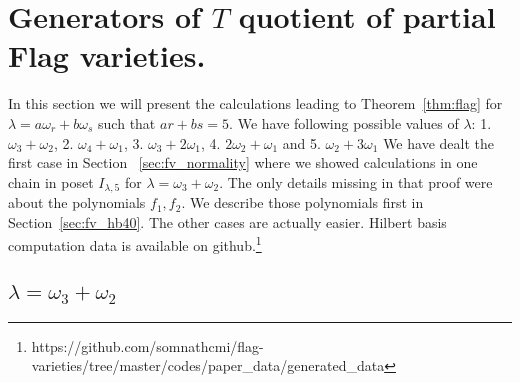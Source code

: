 \section{Generators of \(T\) quotient of partial Flag varieties.}
\label{sec:fv_hb}

In this section we will present the calculations leading to Theorem~\ref{thm:flag} for \(\lambda=a\omega_r+b\omega_s\) such that \(ar+bs = 5\). We have following possible values of \(\lambda\): 1. \(\omega_3+\omega_2\), 2. \(\omega_4+\omega_1\), 3. \(\omega_3+2\omega_1\), 4. \(2\omega_2+\omega_1\) and 5. \(\omega_2+3\omega_1\) We have dealt the first case in Section ~\ref{sec:fv_normality} where we showed calculations in one chain in poset \(I_{\lambda,5}\) for \(\lambda = \omega_3+\omega_2\).
The only details missing in that proof were about the polynomials $f_1, f_2$. We describe those polynomials first in Section~\ref{sec:fv_hb40}. The other cases are actually easier. Hilbert basis computation data is available on github.\footnote{https://github.com/somnathcmi/flag-varieties/tree/master/codes/paper\_data/generated\_data}
\subsection{$\lambda=\omega_3+\omega_2$}
